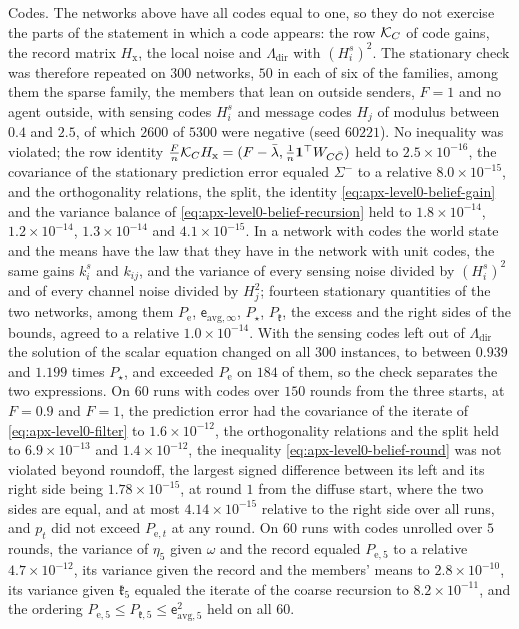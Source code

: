 \begin{numcheck}
Codes. The networks above have all codes equal to one, so they do not exercise the parts of the statement in which a code appears: the row $\mathcal{K}_C$ of code gains, the record matrix $H_{\mathrm x}$, the local noise and $\Lambda_{\mathrm{dir}}$ with $(H^s_i)^2$. The stationary check was therefore repeated on $300$ networks, $50$ in each of six of the families, among them the sparse family, the members that lean on outside senders, $F=1$ and no agent outside, with sensing codes $H^s_i$ and message codes $H_j$ of modulus between $0.4$ and $2.5$, of which $2600$ of $5300$ were negative (seed $60221$). No inequality was violated; the row identity $\frac Fn\mathcal{K}_CH_{\mathrm x}=(F-\bar\lambda,\frac1n\mathbf{1}^\top W_{C\bar C})$ held to $2.5\times10^{-16}$, the covariance of the stationary prediction error equaled $\Sigma^-$ to a relative $8.0\times10^{-15}$, and the orthogonality relations, the split, the identity \eqref{eq:apx-level0-belief-gain} and the variance balance of \eqref{eq:apx-level0-belief-recursion} held to $1.8\times10^{-14}$, $1.2\times10^{-14}$, $1.3\times10^{-14}$ and $4.1\times10^{-15}$. In a network with codes the world state and the means have the law that they have in the network with unit codes, the same gains $k^s_i$ and $k_{ij}$, and the variance of every sensing noise divided by $(H^s_i)^2$ and of every channel noise divided by $H_j^2$; fourteen stationary quantities of the two networks, among them $P_{\mathrm e}$, $\mathsf e_{\mathrm{avg},\infty}$, $P_\star$, $P_{\mathfrak k}$, the excess and the right sides of the bounds, agreed to a relative $1.0\times10^{-14}$. With the sensing codes left out of $\Lambda_{\mathrm{dir}}$ the solution of the scalar equation changed on all $300$ instances, to between $0.939$ and $1.199$ times $P_\star$, and exceeded $P_{\mathrm e}$ on $184$ of them, so the check separates the two expressions. On $60$ runs with codes over $150$ rounds from the three starts, at $F=0.9$ and $F=1$, the prediction error had the covariance of the iterate of \eqref{eq:apx-level0-filter} to $1.6\times10^{-12}$, the orthogonality relations and the split held to $6.9\times10^{-13}$ and $1.4\times10^{-12}$, the inequality \eqref{eq:apx-level0-belief-round} was not violated beyond roundoff, the largest signed difference between its left and its right side being $1.78\times10^{-15}$, at round $1$ from the diffuse start, where the two sides are equal, and at most $4.14\times10^{-15}$ relative to the right side over all runs, and $p_t$ did not exceed $P_{\mathrm e,t}$ at any round. On $60$ runs with codes unrolled over $5$ rounds, the variance of $\eta_5$ given $\omega$ and the record equaled $P_{\mathrm e,5}$ to a relative $4.7\times10^{-12}$, its variance given the record and the members' means to $2.8\times10^{-10}$, its variance given $\mathfrak k_5$ equaled the iterate of the coarse recursion to $8.2\times10^{-11}$, and the ordering $P_{\mathrm e,5}\le P_{\mathfrak k,5}\le\mathsf e_{\mathrm{avg},5}^2$ held on all $60$.
\end{numcheck}

